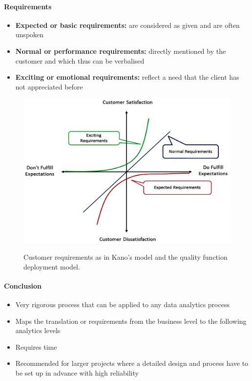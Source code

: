 \documentclass[a4paper, landscape, 6pt, fleqn]{scrartcl}
\renewcommand{\emph}[1]{\textbf{#1}}
\begin{document}
\begin{multicols*}{4}
\paragraph{Requirements}

\begin{itemize}
\item \emph{Expected or basic requirements:} are considered as given and are often unspoken
\item \emph{Normal or performance requirements:} directly mentioned by the customer and which thus can be verbalised
\item \emph{Exciting or emotional requirements:} reflect a need that the client has not appreciated before
\end{itemize}

\begin{figure}[H]
\centering
\includegraphics[width=1.0 \linewidth]{CustomerRequirements}
\label{fig:CustomerRequirements}
\caption{Customer requirements as in Kano's model and the quality function deployment model.}
\end{figure}

\paragraph{Conclusion}

\begin{itemize}
\item Very rigorous process that can be applied to any data analytics process
\item Maps the translation or requirements from the business level to the following analytics levels
\item Requires time
\item Recommended for larger projects where a detailed design and process have to be set up in advance with high reliability
\end{itemize}


\end{multicols*}
\end{document}
